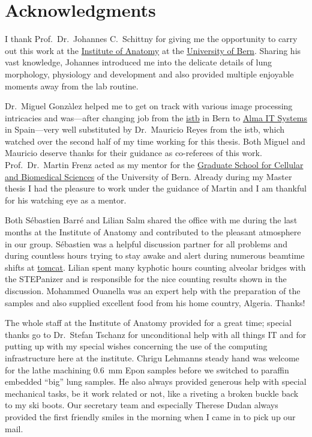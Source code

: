 \acresetall
{}

\begingroup
\let\clearpage\relax
\let\cleardoublepage\relax
\let\cleardoublepage\relax
\chapter*{Acknowledgments}
I thank Prof.\ Dr.\ Johannes C.\ Schittny for giving me the opportunity to carry out this work at the \href{http://www.ana.unibe.ch/}{Institute of Anatomy} at the \href{http://unibe.ch/}{University of Bern}. Sharing his vast knowledge, Johannes introduced me into the delicate details of lung morphology, physiology and development and also provided multiple enjoyable moments away from the lab routine.

Dr.\ Miguel Gonzàlez helped me to get on track with various image processing intricacies and was---after changing job from the \href{http://www.istb.unibe.ch/}{\ac{istb}} in Bern to \href{http://www.alma3d.com/}{Alma IT Systems} in Spain---very well substituted by Dr.\ Mauricio Reyes from the \ac{istb}, which watched over the second half of my time working for this thesis. Both Miguel and Mauricio deserve thanks for their guidance as co-referees of this work. Prof.\ Dr.\ Martin Frenz acted as my mentor for the \href{http://www.gcb.unibe.ch/}{Graduate School for Cellular and Biomedical Sciences} of the University of Bern. Already during my Master thesis I had the pleasure to work under the guidance of  Martin and I am thankful for his watching eye as a mentor.

Both Sébastien Barré and Lilian Salm shared the office with me during the last months at the Institute of Anatomy and contributed to the pleasant atmosphere in our group. Sébastien was a helpful discussion partner for all  problems and during countless hours trying to stay awake and alert during numerous beamtime shifts at \href{http://sls.web.psi.ch/view.php/beamlines/tomcat/}{\acs{tomcat}}. Lilian spent many kyphotic hours counting alveolar bridges with the STEPanizer and is responsible for the nice counting results shown in the discussion. Mohammed Ouanella was an expert help with the preparation of the samples and also supplied excellent food from his home country, Algeria. Thanks!

The whole staff at the Institute of Anatomy provided for a great time; special thanks go to Dr.\ Stefan Tschanz for unconditional help with all things IT and for putting up with my special wishes concerning the use of the computing infrastructure here at the institute. Chrigu Lehmanns steady hand was welcome for the lathe machining \SI{0.6}{\milli\meter} Epon samples before we switched to paraffin embedded ``big'' lung samples. He also always provided generous help with special mechanical tasks, be it work related or not, \eg like a riveting a broken buckle back to my ski boots. Our secretary team and especially Therese Dudan always provided the first friendly smiles in the morning when I came in to pick up our mail.

